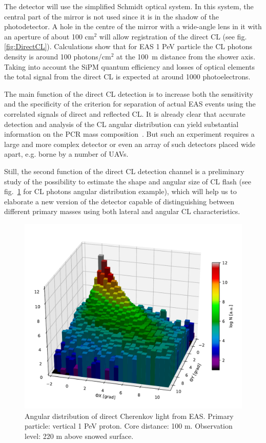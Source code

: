 \documentclass[a4paper,11pt]{article}
\begin{document}
The detector will use the simplified Schmidt optical system. In this system, the central part of the mirror is not used since it is in the shadow of the photodetector. A hole in the centre of the mirror with a wide-angle lens in it with an aperture of about 100 cm$^2$ will allow registration of the direct CL (see fig.\ref{fig:DirectCL}). Calculations show that for EAS 1 PeV particle the CL photons density is around 100 photons/cm$^2$ at the 100~m distance from the shower axis. Taking into account the SiPM quantum efficiency and losses of optical elements the total signal from the direct CL is expected at around 1000 photoelectrons.

The main function of the direct CL detection is to increase both the sensitivity and the specificity of the criterion for separation of actual EAS events using the correlated signals of direct and reflected CL. It is already clear that accurate detection and analysis of the CL angular distribution can yield substantial information on the PCR mass composition~\cite{Gal18a,Gal18b}. But such an experiment requires a large and more complex detector or even an array of such detectors placed wide apart, e.g. borne by a number of UAVs.

Still, the second function of the direct CL detection channel is a preliminary study of the possibility to estimate the shape and angular size of CL flash (see fig.~\ref{fig:CLangular} for CL photons angular distribution example), which will help us to elaborate a new version of the detector capable of distinguishing between different primary masses using both lateral and angular CL characteristics.

\begin{figure}[t]
\centering %
\includegraphics[height=.4\textheight]{ang_distr.pdf}
\caption{Angular distribution of direct Cherenkov light from EAS. Primary particle: vertical 1 PeV proton. Core distance: 100 m. Observation level: 220 m above snowed surface.}
\label{fig:CLangular}
\end{figure}
\end{document}
